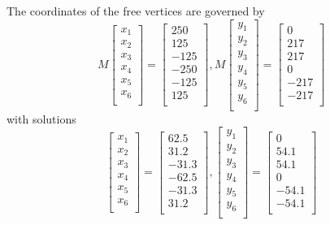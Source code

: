 \documentclass[11pt]{report}
\begin{document}
The coordinates of the free vertices are governed by 
\[
M\begin{bmatrix}
x_1 \\
x_2 \\
x_3 \\
x_4 \\
x_5 \\
x_6 \\
\end{bmatrix}
=\begin{bmatrix}
250 \\
125 \\
-125 \\
-250 \\
-125 \\
125 \\
\end{bmatrix},
M \begin{bmatrix}
y_1 \\
y_2 \\
y_3 \\
y_4 \\
y_5 \\
y_6 \\
\end{bmatrix}
=\begin{bmatrix}
0 \\
217 \\
217 \\
0 \\
-217 \\
-217 \\
\end{bmatrix}
\]
with solutions
\[
\begin{bmatrix}
x_1 \\
x_2 \\
x_3 \\
x_4 \\
x_5 \\
x_6 \\
\end{bmatrix}
=\begin{bmatrix}
62.5 \\
31.2 \\
-31.3 \\
-62.5 \\
-31.3 \\
31.2 \\
\end{bmatrix},
\begin{bmatrix}
y_1 \\
y_2 \\
y_3 \\
y_4 \\
y_5 \\
y_6 \\
\end{bmatrix}
=\begin{bmatrix}
0 \\
54.1 \\
54.1 \\
0 \\
-54.1 \\
-54.1 \\
\end{bmatrix}
\]
\end{document}
